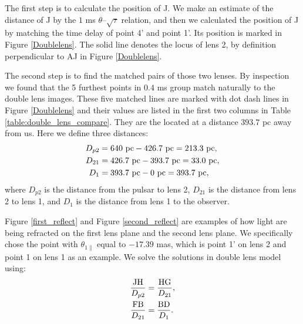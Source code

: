 \documentclass[useAMS,usenatbib]{mn2e}
\begin{document}

The first step is to calculate the position of J. We make an estimate
of the distance of J by the $1$ ms $\theta$--$\sqrt{\tau}$ relation,
and then we calculated the position of J by matching the time delay of
point 4' and point 1'. Its position is marked  in 
Figure \ref{Doublelens}.  The solid line denotes the locus of lens 2,
by definition perpendicular to AJ in Figure 
\ref{Doublelens}.

The second step is to find the matched pairs of those two lenses. By
inspection we found that the 5 furthest points in $0.4$ ms group match
naturally to the double lens images.  These five matched lines are marked with dot dash lines in Figure \ref{Doublelens} and their values are listed in the first two columns in Table \ref{table:double_lens_compare}. They are the located at a distance $393.7$ pc away from us. Here we define three distances:
\begin{equation}
\begin{aligned}
D_{p2}&=640~{\rm pc}-426.7~{\rm pc} =213.3~{\rm pc},\\
D_{21}&=426.7~{\rm pc}-393.7~{\rm pc} =33.0~{\rm pc},\\
D_{1}&=393.7~{\rm pc}- 0~{\rm pc} = 393.7~{\rm pc}, 
\end{aligned} 
\end{equation}
where $D_{p2}$ is the distance from the pulsar to lens 2, $D_{21}$ is the distance from lens 2 to lens 1, and $D_{1}$ is the distance from lens 1 to the observer.

Figure \ref{first_reflect} and Figure \ref{second_reflect} are examples of how light are being refracted on the first lens plane and the second lens plane. We specifically chose the point with $\theta_{1\parallel}$ equal to $-17.39$ mas, which is point 1' on lens 2 and point 1 on lens 1 as an example. We solve the solutions in double lens model using:
\begin{equation}
\begin{aligned}
\frac{\rm JH}{D_{p2}}&=\frac{\rm HG}{D_{21}},\\
\frac{\rm FB}{D_{21}}&=\frac{\rm BD}{D_{1}}.
\end{aligned}
\end{equation}
\end{document}
